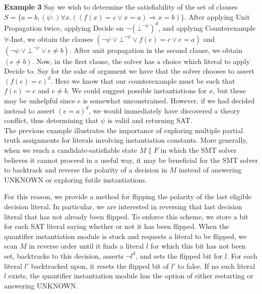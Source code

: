 \documentclass{llncs}
\begin{document}
{\bf Example 3} 
Say we wish to determine the satisfiability of the set of clauses $S = \{ a = b, (\psi :) \forall x. ((f(x) = c \vee x = a) \Rightarrow x = b) \}$.
After applying Unit Propagation twice, applying Decide on $\neg (\bot^{ \neg \psi })^d$, and applying Counterexample $\forall$-Inst, we obtain the clauses $( \neg \psi \vee \bot^{ \neg \psi } \vee f(e) = c \vee e = a )$ and $( \neg \psi \vee \bot^{ \neg \psi } \vee e \neq b )$.
After unit propagation in the second clause, we obtain $( e \neq b )$.
Now, in the first clause, the solver has a choice which literal to apply Decide to.
Say for the sake of argument we have that the solver chooses to assert $( f(e) = c )^d$.
Here we know that our counterexample must be such that $f( e ) = c$ and $e \neq b$.
We could suggest possible instantiations for $x$, but these may be unhelpful since $e$ is somewhat unconstrained.
However, if we had decided instead to assert $( e = a )^d$, we would immediately have discovered a theory conflict, thus determining that $\psi$ is valid and returning SAT. \\

The previous example illustrates the importance of exploring multiple partial truth assignments for literals involving instantiation constants.
More generally, when we reach a candidate-satisfiable state $M \parallel F$ in which the SMT solver believes it cannot proceed in a useful way, it may be beneficial for the SMT solver to backtrack and reverse the polarity of a decision in $M$ instead of answering UNKNOWN or exploring futile instantiations.

For this reason, we provide a method for flipping the polarity of the last eligible decision literal.
In particular, we are interested in reversing that last decision literal that has not already been flipped.
To enforce this scheme, we store a bit for each SAT literal saying whether or not it has been flipped.
When the quantifier instantiation module is stuck and requests a literal to be flipped, we scan $M$ in reverse order until it finds a literal $l$ for which this bit has not been set, backtracks to this decision, asserts $\neg l^d$, and sets the flipped bit for $l$.
For each literal $l'$ backtracked upon, it resets the flipped bit of $l'$ to false.
If no such literal $l$ exists, the quantifier instantiation module has the option of either restarting or answering UNKNOWN.
\end{document}
